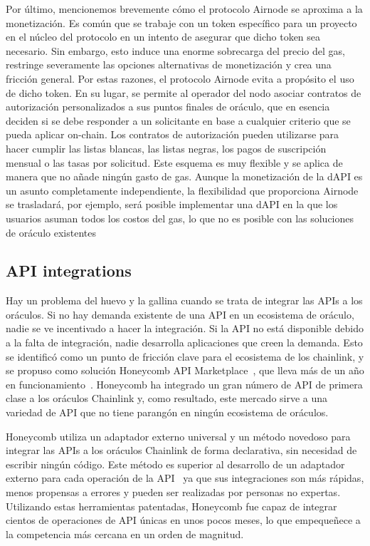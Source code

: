 \documentclass[11pt]{article}
\begin{document}
Por último, mencionemos brevemente cómo el protocolo Airnode se aproxima a la monetización.    Es común que se trabaje con un token específico para un proyecto en el núcleo del protocolo en un intento de asegurar que dicho token sea necesario.   Sin embargo, esto induce una enorme sobrecarga del precio del gas, restringe severamente las opciones alternativas de monetización y crea una fricción general. Por estas razones, el protocolo Airnode evita a propósito el uso de dicho token. En su lugar, se permite al operador del nodo asociar contratos de autorización personalizados a sus puntos finales de oráculo, que en esencia deciden si se debe responder a un solicitante en base a cualquier criterio que se pueda aplicar on-chain. Los contratos de autorización pueden utilizarse para hacer cumplir las listas blancas, las listas negras, los pagos de suscripción mensual o las tasas por solicitud. Este esquema es muy flexible y se aplica de manera que no añade ningún gasto de gas.  Aunque la monetización de la dAPI es un asunto completamente independiente, la flexibilidad que proporciona Airnode se trasladará, por ejemplo, será posible implementar una dAPI en la que los usuarios asuman todos los costos del gas, lo que no es posible con las soluciones de oráculo existentes

\subsection{API integrations}
\label{sec:api-integrations}

Hay un problema del huevo y la gallina cuando se trata de integrar las APIs a los oráculos. Si no hay demanda existente de una API en un ecosistema de oráculo, nadie se ve incentivado a hacer la integración. Si la API no está disponible debido a la falta de integración, nadie desarrolla aplicaciones que creen la demanda. Esto se identificó como un punto de fricción clave para el ecosistema de los chainlink, y se propuso como solución Honeycomb API Marketplace~\cite{benligiray:2019}, que lleva más de un año en funcionamiento~\cite{honeycomb.market}.
Honeycomb ha integrado un gran número de API de primera clase a los oráculos Chainlink y, como resultado, este mercado sirve a una variedad de API que no tiene parangón en ningún ecosistema de oráculos.

Honeycomb utiliza un adaptador externo universal y un método novedoso para integrar las APIs a los oráculos Chainlink de forma declarativa, sin necesidad de escribir ningún código. Este método es superior al desarrollo de un adaptador externo para cada operación de la API~\cite{external-adapters} ya que sus integraciones son más rápidas, menos propensas a errores y pueden ser realizadas por personas no expertas. Utilizando estas herramientas patentadas, Honeycomb fue capaz de integrar cientos de operaciones de API únicas en unos pocos meses, lo que empequeñece a la competencia más cercana en un orden de magnitud.
\end{document}
